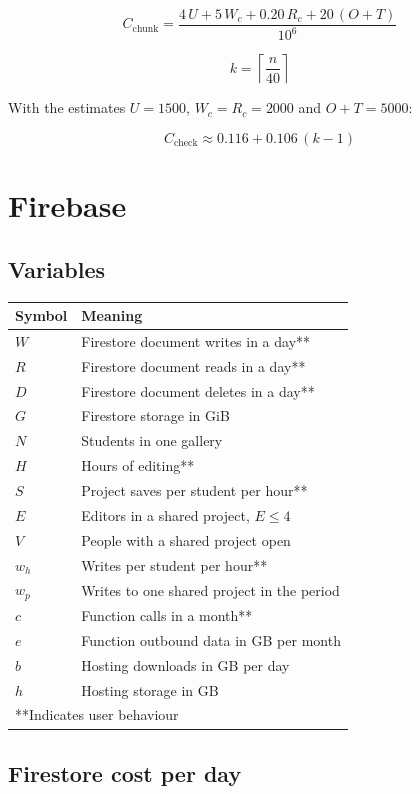 \documentclass[11pt]{article}
\begin{document}
\[
C_{\text{chunk}} =
\frac{4\,U + 5\,W_c + 0.20\,R_c + 20\,(O + T)}{10^{6}}
\]

\[
k = \left\lceil \frac{n}{40} \right\rceil
\]

With the estimates $U = 1500$, $W_c = R_c = 2000$ and $O + T = 5000$:

\[
C_{\text{check}} \approx 0.116 + 0.106\,(k - 1)
\]

\section{Firebase}

\subsection{Variables}

\begin{center}
\begin{tabular}{ll}
\toprule
Symbol & Meaning \\
\midrule
$W$ & Firestore document writes in a day** \\
$R$ & Firestore document reads in a day** \\
$D$ & Firestore document deletes in a day** \\
$G$ & Firestore storage in GiB \\
$N$ & Students in one gallery \\
$H$ & Hours of editing** \\
$S$ & Project saves per student per hour** \\
$E$ & Editors in a shared project, $E \le 4$ \\
$V$ & People with a shared project open \\
$w_h$ & Writes per student per hour** \\
$w_p$ & Writes to one shared project in the period \\
$c$ & Function calls in a month** \\
$e$ & Function outbound data in GB per month \\
$b$ & Hosting downloads in GB per day \\
$h$ & Hosting storage in GB \\
\multicolumn{2}{l}{**Indicates user behaviour} \\
\bottomrule
\end{tabular}
\end{center}

\subsection{Firestore cost per day}
\end{document}
